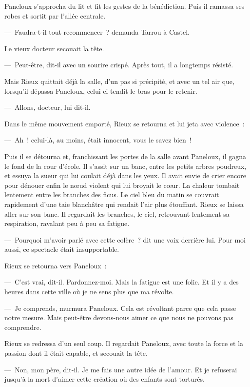 \documentclass[french,twoside]{book} %
\begin{document}
Paneloux s’approcha du lit et fit les gestes de la bénédiction. Puis il ramassa ses robes et sortit par l’allée centrale.\par
— Faudra-t-il tout recommencer ? demanda Tarrou à Castel.\par
Le vieux docteur secouait la tête.\par
— Peut-être, dit-il avec un sourire crispé. Après tout, il a longtemps résisté.\par
Mais Rieux quittait déjà la salle, d’un pas si précipité, et avec un tel air que, lorsqu’il dépassa Paneloux, celui-ci tendit le bras pour le retenir.\par
— Allons, docteur, lui dit-il.\par
Dans le même mouvement emporté, Rieux se retourna et lui jeta avec violence :\par
— Ah ! celui-là, au moins, était innocent, vous le savez bien !\par
Puis il se détourna et, franchissant les portes de la salle avant Paneloux, il gagna le fond de la cour d’école. Il s’assit sur un banc, entre les petits arbres poudreux, et essuya la sueur qui lui coulait déjà dans les yeux. Il avait envie de crier encore pour dénouer enfin le nœud violent qui lui broyait le cœur. La chaleur tombait lentement entre les branches des ficus. Le ciel bleu du matin se couvrait rapidement d’une taie blanchâtre qui rendait l’air plus étouffant. Rieux se laissa aller sur son banc. Il regardait les branches, le ciel, retrouvant lentement sa respiration, ravalant peu à peu sa fatigue.\par
— Pourquoi m’avoir parlé avec cette colère ? dit une voix derrière lui. Pour moi aussi, ce spectacle était insupportable.\par
Rieux se retourna vers Paneloux :\par
— C’est vrai, dit-il. Pardonnez-moi. Mais la fatigue est une folie. Et il y a des heures dans cette ville où je ne sens plus que ma révolte.\par
— Je comprends, murmura Paneloux. Cela est révoltant parce que cela passe notre mesure. Mais peut-être devons-nous aimer ce que nous ne pouvons pas comprendre.\par
Rieux se redressa d’un seul coup. Il regardait Paneloux, avec toute la force et la passion dont il était capable, et secouait la tête.\par
— Non, mon père, dit-il. Je me fais une autre idée de l’amour. Et je refuserai jusqu’à la mort d’aimer cette création où des enfants sont torturés.\par
\end{document}
